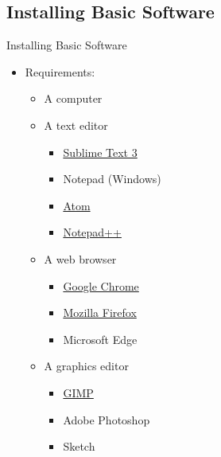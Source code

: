 \documentclass[aspectratio=169]{beamer}
\begin{document}
\begin{darkframes}
    \section{Installing Basic Software}
    \begin{frame}{Installing Basic Software}
        \begin{itemize}
            \item Requirements:
            \begin{itemize}
                \item A computer
                \item A text editor
                \begin{itemize}
                    \item \href{https://www.sublimetext.com/3}{Sublime Text 3}
                    \item Notepad (Windows)
                    \item \href{https://flight-manual.atom.io/getting-started/sections/installing-atom/}{Atom}
                    \item \href{https://notepad-plus-plus.org/download/v7.6.4.html}{Notepad++}
                \end{itemize}
                \item A web browser
                \begin{itemize}
                    \item \href{https://support.google.com/chrome/answer/95346?co=GENIE.Platform\%3DDesktop\&hl=en}{Google Chrome}
                    \item \href{https://www.mozilla.org/en-US/firefox/new/}{Mozilla Firefox}
                    \item Microsoft Edge
                \end{itemize}
                \item A graphics editor
                \begin{itemize}
                    \item \href{https://www.gimp.org/downloads/}{GIMP}
                    \item Adobe Photoshop
                    \item Sketch
                \end{itemize}
            \end{itemize}
        \end{itemize}
    \end{frame}
    

\end{darkframes}
\end{document}
